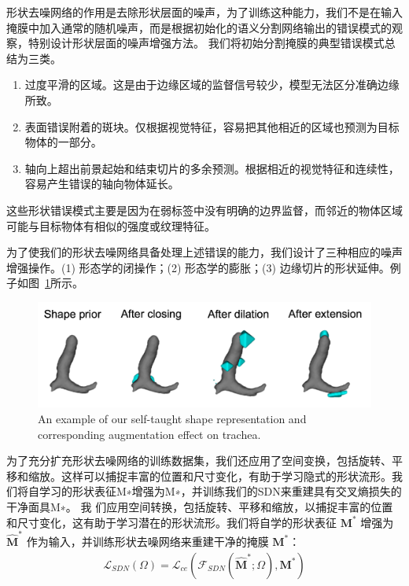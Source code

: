 形状去噪网络的作用是去除形状层面的噪声，为了训练这种能力，我们不是在输入掩膜中加入通常的随机噪声，而是根据初始化的语义分割网络输出的错误模式的观察，特别设计形状层面的噪声增强方法。
我们将初始分割掩膜的典型错误模式总结为三类。
\begin{enumerate}
    \item 过度平滑的区域。这是由于边缘区域的监督信号较少，模型无法区分准确边缘所致。
    \item 表面错误附着的斑块。仅根据视觉特征，容易把其他相近的区域也预测为目标物体的一部分。
    \item 轴向上超出前景起始和结束切片的多余预测。根据相近的视觉特征和连续性，容易产生错误的轴向物体延长。
\end{enumerate}
这些形状错误模式主要是因为在弱标签中没有明确的边界监督，而邻近的物体区域可能与目标物体有相似的强度或纹理特征。

为了使我们的形状去噪网络具备处理上述错误的能力，我们设计了三种相应的噪声增强操作。(1) 形态学的闭操作；(2) 形态学的膨胀；(3) 边缘切片的形状延伸。例子如图~\ref{fig:shape_aug}所示。
    \begin{figure}[tbp]
        \centering 
        \includegraphics[width=1.0\textwidth]{img/c3/b_shape_aug2.png}
        {An example of our self-taught shape representation and corresponding augmentation effect on trachea.}
        \label{fig:shape_aug}
    \end{figure}
为了充分扩充形状去噪网络的训练数据集，我们还应用了空间变换，包括旋转、平移和缩放。这样可以捕捉丰富的位置和尺寸变化，有助于学习隐式的形状流形。我们将自学习的形状表征M∗增强为M∗，并训练我们的SDN来重建具有交叉熵损失的干净面具M∗。
我
们应用空间转换，包括旋转、平移和缩放，以捕捉丰富的位置和尺寸变化，这有助于学习潜在的形状流形。我们将自学的形状表征 $\mathbf{M}^*$ 增强为 $\mathbf{\hat{M}}^*$ 作为输入，并训练形状去噪网络来重建干净的掩膜 $\mathbf{M}^*$：
\begin{align}
    \mathcal{L}_{SDN} (\Omega) = \mathcal{L}_{ce} (\mathcal{F}_{SDN} (\mathbf{\hat{M}}^*; \Omega), \mathbf{M}^*)
\end{align}


